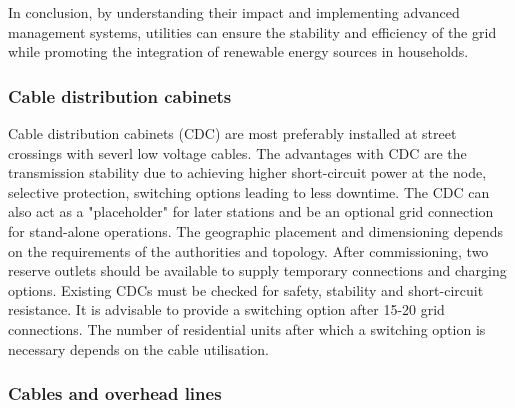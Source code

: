 In conclusion, by understanding their impact and implementing advanced management systems, utilities can ensure the stability and efficiency of the grid while promoting the integration of renewable energy sources in households.



\subsubsection{Cable distribution cabinets}

Cable distribution cabinets (CDC) are most preferably installed at street crossings with severl low voltage cables. The advantages with CDC are the transmission stability due to achieving higher short-circuit power at the node, selective protection, switching options leading to less downtime. The CDC can also act as a "placeholder" for later stations and be an optional grid connection for stand-alone operations. The geographic placement and dimensioning depends on the requirements of the authorities and topology. After commissioning, two reserve outlets should be available to supply temporary connections and charging options.
Existing CDCs must be checked for safety, stability and short-circuit resistance.
It is advisable to provide a switching option after 15-20 grid connections. The number of residential units after which a switching option is necessary depends on the cable utilisation. %


\subsubsection{Cables and overhead lines}


